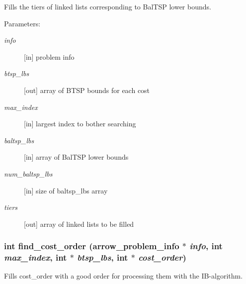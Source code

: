 Fills the tiers of linked lists corresponding to BalTSP lower bounds. 

\begin{Desc}
\item[Parameters:]
\begin{description}
\item[{\em info}]\mbox{[}in\mbox{]} problem info \item[{\em btsp\_\-lbs}]\mbox{[}out\mbox{]} array of BTSP bounds for each cost \item[{\em max\_\-index}]\mbox{[}in\mbox{]} largest index to bother searching \item[{\em baltsp\_\-lbs}]\mbox{[}in\mbox{]} array of BalTSP lower bounds \item[{\em num\_\-baltsp\_\-lbs}]\mbox{[}in\mbox{]} size of baltsp\_\-lbs array \item[{\em tiers}]\mbox{[}out\mbox{]} array of linked lists to be filled \end{description}
\end{Desc}
\hypertarget{lib_2baltsp_2baltsp-ib2_8c_fe2b4359a26c49fe7602c86021b91ee7}{
\subsubsection[{find\_\-cost\_\-order}]{\setlength{\rightskip}{0pt plus 5cm}int find\_\-cost\_\-order ({\bf arrow\_\-problem\_\-info} $\ast$ {\em info}, \/  int {\em max\_\-index}, \/  int $\ast$ {\em btsp\_\-lbs}, \/  int $\ast$ {\em cost\_\-order})}}
\label{lib_2baltsp_2baltsp-ib2_8c_fe2b4359a26c49fe7602c86021b91ee7}


Fills cost\_\-order with a good order for processing them with the IB-algorithm. 

